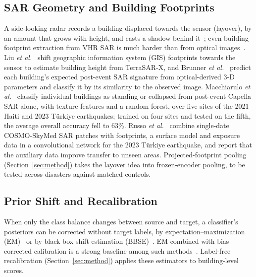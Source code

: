 \documentclass[journal]{IEEEtran}
\begin{document}
\subsection{SAR Geometry and Building Footprints}
A side-looking radar records a building displaced towards the sensor (layover), by an amount that grows with height, and casts a shadow behind it~\cite{moreira2013tutorial}; even building footprint extraction from VHR SAR is much harder than from optical images~\cite{shermeyer2020spacenet6}. Liu \emph{et al.}~\cite{liu2014height} shift geographic information system (GIS) footprints towards the sensor to estimate building height from TerraSAR-X, and Brunner \emph{et al.}~\cite{brunner2010earthquake} predict each building's expected post-event SAR signature from optical-derived 3-D parameters and classify it by its similarity to the observed image. Macchiarulo \emph{et al.}~\cite{macchiarulo2025sar} classify individual buildings as standing or collapsed from post-event Capella SAR alone, with texture features and a random forest, over five sites of the 2021 Haiti and 2023 T\"urkiye earthquakes; trained on four sites and tested on the fifth, the average overall accuracy fell to 63\%. Russo \emph{et al.}~\cite{russo2026cosmo} combine single-date COSMO-SkyMed SAR patches with footprints, a surface model and exposure data in a convolutional network for the 2023 T\"urkiye earthquake, and report that the auxiliary data improve transfer to unseen areas. Projected-footprint pooling (Section~\ref{sec:method}) takes the layover idea into frozen-encoder pooling, to be tested across disasters against matched controls.

\subsection{Prior Shift and Recalibration}
When only the class balance changes between source and target, a classifier's posteriors can be corrected without target labels, by expectation--maximization (EM)~\cite{saerens2002adjusting} or by black-box shift estimation (BBSE)~\cite{lipton2018bbse}. EM combined with bias-corrected calibration is a strong baseline among such methods~\cite{alexandari2020bcts}. Label-free recalibration (Section~\ref{sec:method}) applies these estimators to building-level scores.
\end{document}

